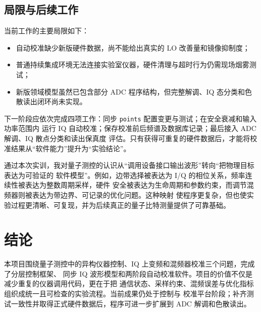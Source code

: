 \documentclass[UTF8,zihao=-4,a4paper]{ctexart}
\begin{document}
\subsection{局限与后续工作}

当前工作的主要局限如下：
\begin{itemize}
  \item 自动校准缺少新版硬件数据，尚不能给出真实的 LO 改善量和镜像抑制度；
  \item 普通持续集成环境无法连接实验室仪器，硬件清理与超时行为仍需现场烟雾测试；
  \item 新版领域模型虽然已包含部分 ADC 程序结构，但完整解调、IQ 态分类和色散读出闭环尚未实现。
\end{itemize}

下一阶段应依次完成四项工作：同步 \texttt{points} 配置变更与测试；在安全衰减和输入功率范围内
运行 IQ 自动校准；保存校准前后频谱及数据库记录；最后接入 ADC 解调、IQ 散点分类和读出保真度
评估。只有获得可重复的硬件数据后，才能将校准结果从“软件能力”提升为“实验结论”。

通过本次实训，我对量子测控的认识从“调用设备接口输出波形”转向“把物理目标表达为可验证的
软件模型”。例如，边带选择被表达为 I/Q 的相位关系，频率连续性被表达为整数周期采样，硬件
安全被表达为生命周期和参数约束，而调节混频器则被表达为带边界、可记录的优化问题。这种映射
使程序更复杂，但也使实验过程更清晰、可复现，并为后续真正的量子比特测量提供了可靠基础。

\section{结论}

本项目围绕量子测控中的异构仪器控制、IQ 上变频和混频器校准三个问题，完成了分层控制框架、
同步 IQ 波形模型和两阶段自动校准软件。项目的价值不仅是减少重复的仪器调用代码，更在于把
通信状态、采样约束、混频误差与优化指标组织成统一且可检查的实验流程。当前成果仍处于控制与
校准平台阶段；补齐测试一致性并取得正式硬件数据后，程序可进一步扩展到 ADC 解调和色散读出。

\printbibliography[title={参考文献}]
\end{document}

